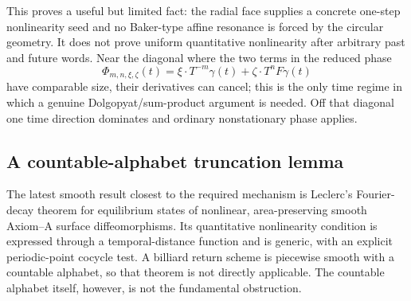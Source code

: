 \documentclass[11pt]{article}
\begin{document}
This proves a useful but limited fact: the radial face supplies a concrete
one-step nonlinearity seed and no Baker-type affine resonance is forced by
the circular geometry.  It does not prove uniform quantitative nonlinearity
after arbitrary past and future words.  Near the diagonal where the two
terms in the reduced phase
\begin{equation}
\label{eq:phase}
 \Phi_{m,n,\xi,\zeta}(t)
 =\xi\cdot T^{-m}\gamma(t)+\zeta\cdot T^nF\gamma(t)
\end{equation}
have comparable size, their derivatives can cancel;
this is the only time regime in which a genuine Dolgopyat/sum-product
argument is needed.  Off that diagonal one time direction dominates and
ordinary nonstationary phase applies.

\subsection{A countable-alphabet truncation lemma}

The latest smooth result closest to the required mechanism is Leclerc's
Fourier-decay theorem for equilibrium states of nonlinear, area-preserving
smooth Axiom--A surface diffeomorphisms.  Its quantitative nonlinearity
condition is expressed through a temporal-distance function and is generic,
with an explicit periodic-point cocycle test.  A billiard return scheme is
piecewise smooth with a countable alphabet, so that theorem is not directly
applicable.  The countable alphabet itself, however, is not the fundamental
obstruction.
\end{document}

